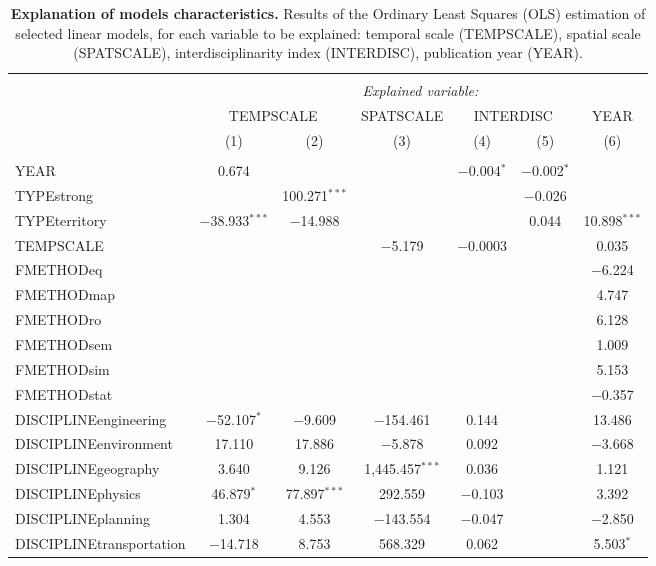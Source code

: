 \documentclass[10pt]{article}
\begin{document}
\begin{table}%
\caption{\textbf{Explanation of models characteristics.} Results of the Ordinary Least Squares (OLS) estimation of selected linear models, for each variable to be explained: temporal scale (TEMPSCALE), spatial scale (SPATSCALE), interdisciplinarity index (INTERDISC), publication year (YEAR).\label{tab:quantepistemo:regressions}}
\begin{tabular}{lcccccc} 
\footnotesize
\\[-1.8ex]\hline 
\hline \\[-1.8ex] 
 & \multicolumn{6}{c}{\textit{Explained variable:}} \\ 
\cline{2-7} 
 & \multicolumn{2}{c}{TEMPSCALE} & SPATSCALE & \multicolumn{2}{c}{INTERDISC} & YEAR \\ 
 & (1) & (2) & (3) & (4) & (5) & (6)\\ 
\hline \\[-1.8ex] 
 YEAR & 0.674 &  &  & $-$0.004$^{*}$ & $-$0.002$^{*}$ &  \\ 
  TYPEstrong &  & 100.271$^{***}$ &  &  & $-$0.026 &  \\ 
  TYPEterritory & $-$38.933$^{***}$ & $-$14.988 &  &  & 0.044 & 10.898$^{***}$ \\ 
  TEMPSCALE &  &  & $-$5.179 & $-$0.0003 &  & 0.035 \\ 
  FMETHODeq &  &  &  &  &  & $-$6.224 \\ 
  FMETHODmap &  &  &  &  &  & 4.747 \\ 
  FMETHODro &  &  &  &  &  & 6.128 \\ 
  FMETHODsem &  &  &  &  &  & 1.009 \\ 
  FMETHODsim &  &  &  &  &  & 5.153 \\ 
  FMETHODstat &  &  &  &  &  & $-$0.357 \\ 
  DISCIPLINEengineering & $-$52.107$^{*}$ & $-$9.609 & $-$154.461 & 0.144 &  & 13.486 \\ 
  DISCIPLINEenvironment & 17.110 & 17.886 & $-$5.878 & 0.092 &  & $-$3.668 \\ 
  DISCIPLINEgeography & 3.640 & 9.126 & 1,445.457$^{***}$ & 0.036 &  & 1.121 \\ 
  DISCIPLINEphysics & 46.879$^{*}$ & 77.897$^{***}$ & 292.559 & $-$0.103 &  & 3.392 \\ 
  DISCIPLINEplanning & 1.304 & 4.553 & $-$143.554 & $-$0.047 &  & $-$2.850 \\ 
  DISCIPLINEtransportation & $-$14.718 & 8.753 & 568.329 & 0.062 &  & 5.503$^{*}$ \\ 

\end{tabular}
\end{table}
\end{document}
